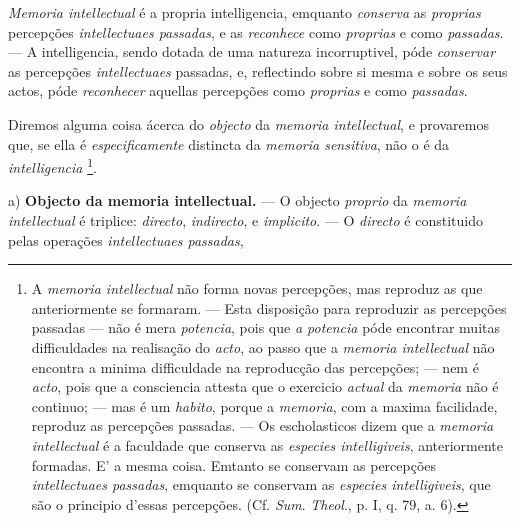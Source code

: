 
\emph{Memoria intellectual} é a propria intelligencia, emquanto \emph{conserva} as \emph{proprias} percepções \emph{intellectuaes passadas}, e as \emph{reconhece} como \emph{proprias} e como \emph{passadas}. --- A intelligencia, sendo dotada de uma natureza incorruptivel, póde \emph{conservar} as percepções \emph{intellectuaes} passadas, e, reflectindo     sobre si mesma e sobre os seus actos, póde \emph{reconhecer} aquellas percepções como \emph{proprias} e como \emph{passadas}.

Diremos alguma coisa ácerca do \emph{objecto} da \emph{memoria intellectual}, e provaremos que, se ella é \emph{especificamente} distincta da \emph{memoria sensitiva}, não o é da \emph{intelligencia} \footnote{A \emph{memoria intellectual} não forma novas percepções, mas reproduz as que anteriormente se formaram. --- Esta disposição para reproduzir as percepções passadas --- não é mera \emph{potencia}, pois que \emph{a potencia} póde encontrar muitas difficuldades na realisação do \emph{acto}, ao passo que a \emph{memoria intellectual} não encontra a minima difficuldade na reproducção das percepções; --- nem é \emph{acto}, pois que a consciencia attesta que o exercicio \emph{actual} da \emph{memoria} não é continuo; --- mas é um \emph{habito}, porque a \emph{memoria}, com a maxima facilidade, reproduz as percepções passadas. --- Os escholasticos dizem que a \emph{memoria intellectual} é a faculdade que conserva as \emph{especies intelligiveis}, anteriormente formadas. E' a mesma coisa. Emtanto se conservam as percepções \emph{intellectuaes passadas}, emquanto se conservam as \emph{especies intelligiveis}, que são o principio d'essas percepções. (Cf. \emph{Sum}. \emph{Theol}., p. I, q. 79, a. 6).}.

a) \textbf{Objecto da memoria intellectual.} --- O objecto \emph{proprio} da \emph{memoria intellectual} é triplice: \emph{directo}, \emph{indirecto}, e \emph{implicito}. --- O \emph{directo} é constituido pelas operações \emph{intellectuaes passadas},

